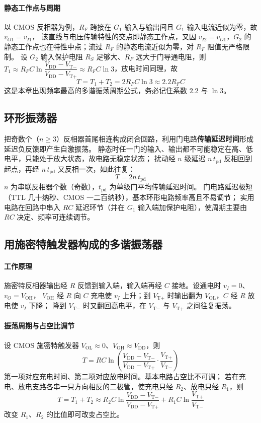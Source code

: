 \paragraph{静态工作点与周期}
以 CMOS 反相器为例，$R_F$ 跨接在 $G_1$ 输入与输出间且 $G_1$ 输入电流近似为零，故 $v_{O1}=v_{I1}$，
该直线与电压传输特性的交点即静态工作点，又因 $v_{I2}=v_{O1}$，$G_2$ 的静态工作点也在特性中点；流过 $R_F$ 的静态电流近似为零，对 $R_F$ 阻值无严格限制。
设 $G_2$ 输入保护电阻 $R_S$ 足够大、$R_F$ 远大于门导通电阻，则
$T_1\approx R_FC\ln\dfrac{V_\text{DD}-V_{\text{T}-}}{V_\text{DD}-V_{\text{T}+}}\approx R_FC\ln3$，放电时间同理，故
\[
T=T_1+T_2=2R_FC\ln3\approx2.2R_FC
\]
这是本章出现频率最高的多谐振荡周期公式，务必记住系数 $2.2$ 与 $\ln3$。

\subsection{环形振荡器}
把奇数个（$n\ge3$）反相器首尾相连构成闭合回路，利用门电路\textbf{传输延迟时间}形成延迟负反馈即产生自激振荡。
静态时任一门的输入、输出都不可能稳定在高、低电平，只能处于放大状态，故电路无稳定状态；
扰动经 $n$ 级延迟 $n\,t_\text{pd}$ 反相回到起点，再经 $n\,t_\text{pd}$ 又反相一次，如此往复：
\[
T=2n\,t_\text{pd}
\]
$n$ 为串联反相器个数（奇数），$t_\text{pd}$ 为单级门平均传输延迟时间。
门电路延迟极短（TTL 几十纳秒、CMOS 一二百纳秒），基本环形电路频率高且不易调节；
实用电路在回路中串入 $RC$ 延迟环节（并在 $G_1$ 输入端加保护电阻），使周期主要由 $RC$ 决定、频率可连续调节。

\subsection{用施密特触发器构成的多谐振荡器}
\paragraph{工作原理}
施密特反相器输出经 $R$ 反馈到输入端，输入端再经 $C$ 接地。设通电时 $v_I=0$、$v_O=V_\text{OH}$，
$V_\text{OH}$ 经 $R$ 向 $C$ 充电使 $v_I$ 上升；到 $V_{\text{T}+}$ 时输出翻为 $V_\text{OL}$，$C$ 经 $R$ 放电使 $v_I$ 下降；
降到 $V_{\text{T}-}$ 时又翻回高电平，在 $V_{\text{T}-}$ 与 $V_{\text{T}+}$ 之间往复振荡。

\paragraph{振荡周期与占空比调节}
设 CMOS 施密特触发器 $V_\text{OL}\approx0$、$V_\text{OH}\approx V_\text{DD}$，则
\[
T=RC\ln\left(\frac{V_\text{DD}-V_{\text{T}-}}{V_\text{DD}-V_{\text{T}+}}\cdot\frac{V_{\text{T}+}}{V_{\text{T}-}}\right)
\]
第一项对应充电时间、第二项对应放电时间。基本电路占空比不可调；
若在充电、放电支路各串一只方向相反的二极管，使充电只经 $R_2$、放电只经 $R_1$，则
\[
T=T_1+T_2\approx R_2C\ln\frac{V_\text{DD}-V_{\text{T}-}}{V_\text{DD}-V_{\text{T}+}}
+R_1C\ln\frac{V_{\text{T}+}}{V_{\text{T}-}}
\]
改变 $R_1$、$R_2$ 的比值即可改变占空比。

